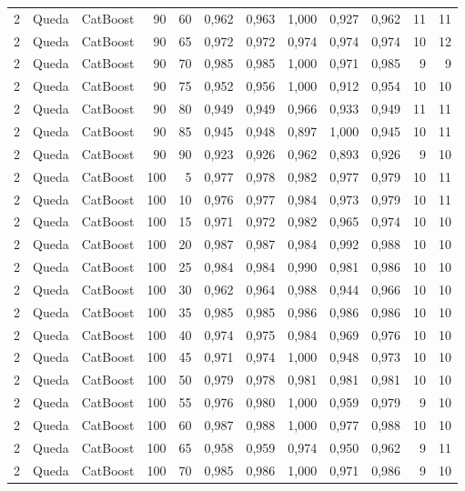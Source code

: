 \begin{longtable}{@{}rllrrrrrrrrr@{}}
2 & Queda & CatBoost & 90 & 60 & 0,962 & 0,963 & 1,000 & 0,927 & 0,962 & 11 & 11 \\
2 & Queda & CatBoost & 90 & 65 & 0,972 & 0,972 & 0,974 & 0,974 & 0,974 & 10 & 12 \\
2 & Queda & CatBoost & 90 & 70 & 0,985 & 0,985 & 1,000 & 0,971 & 0,985 & 9 & 9 \\
2 & Queda & CatBoost & 90 & 75 & 0,952 & 0,956 & 1,000 & 0,912 & 0,954 & 10 & 10 \\
2 & Queda & CatBoost & 90 & 80 & 0,949 & 0,949 & 0,966 & 0,933 & 0,949 & 11 & 11 \\
2 & Queda & CatBoost & 90 & 85 & 0,945 & 0,948 & 0,897 & 1,000 & 0,945 & 10 & 11 \\
2 & Queda & CatBoost & 90 & 90 & 0,923 & 0,926 & 0,962 & 0,893 & 0,926 & 9 & 10 \\
2 & Queda & CatBoost & 100 & 5 & 0,977 & 0,978 & 0,982 & 0,977 & 0,979 & 10 & 11 \\
2 & Queda & CatBoost & 100 & 10 & 0,976 & 0,977 & 0,984 & 0,973 & 0,979 & 10 & 11 \\
2 & Queda & CatBoost & 100 & 15 & 0,971 & 0,972 & 0,982 & 0,965 & 0,974 & 10 & 10 \\
2 & Queda & CatBoost & 100 & 20 & 0,987 & 0,987 & 0,984 & 0,992 & 0,988 & 10 & 10 \\
2 & Queda & CatBoost & 100 & 25 & 0,984 & 0,984 & 0,990 & 0,981 & 0,986 & 10 & 10 \\
2 & Queda & CatBoost & 100 & 30 & 0,962 & 0,964 & 0,988 & 0,944 & 0,966 & 10 & 10 \\
2 & Queda & CatBoost & 100 & 35 & 0,985 & 0,985 & 0,986 & 0,986 & 0,986 & 10 & 10 \\
2 & Queda & CatBoost & 100 & 40 & 0,974 & 0,975 & 0,984 & 0,969 & 0,976 & 10 & 10 \\
2 & Queda & CatBoost & 100 & 45 & 0,971 & 0,974 & 1,000 & 0,948 & 0,973 & 10 & 10 \\
2 & Queda & CatBoost & 100 & 50 & 0,979 & 0,978 & 0,981 & 0,981 & 0,981 & 10 & 10 \\
2 & Queda & CatBoost & 100 & 55 & 0,976 & 0,980 & 1,000 & 0,959 & 0,979 & 9 & 10 \\
2 & Queda & CatBoost & 100 & 60 & 0,987 & 0,988 & 1,000 & 0,977 & 0,988 & 10 & 10 \\
2 & Queda & CatBoost & 100 & 65 & 0,958 & 0,959 & 0,974 & 0,950 & 0,962 & 9 & 11 \\
2 & Queda & CatBoost & 100 & 70 & 0,985 & 0,986 & 1,000 & 0,971 & 0,986 & 9 & 10 \\

\end{longtable}
